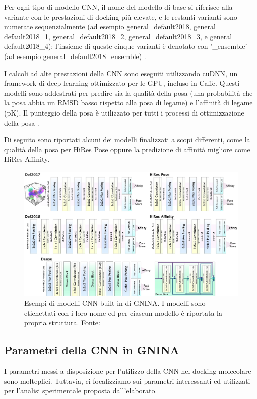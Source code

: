 Per ogni tipo di modello CNN, il nome del modello di base si riferisce alla variante con le prestazioni di docking più elevate, e le restanti varianti sono numerate sequenzialmente (ad esempio general\_default2018, general\_ default2018\_1, general\_default2018\_2, general\_default2018\_3, e general\_ default2018\_4); l'insieme di queste cinque varianti è denotato con '\_ensemble' (ad esempio general\_default2018\_ensemble) \cite{mcnutt_gnina_2021}. 

I calcoli ad alte prestazioni della CNN sono eseguiti utilizzando cuDNN, un framework di deep learning  ottimizzato per le GPU, incluso in Caffe. Questi modelli sono addestrati per predire sia la qualità della posa (una probabilità che la posa abbia un RMSD basso rispetto alla posa di legame) e l'affinità di legame (pK). 
Il punteggio della posa è utilizzato per tutti i processi di ottimizzazione della posa \cite{mcnutt_gnina_2021}.

Di seguito sono riportati alcuni dei modelli finalizzati a scopi differenti, come la qualità della posa per HiRes Pose oppure la predizione di affinità migliore come HiRes Affinity.
\begin{figure}[H]
    \centering
    \includegraphics[scale=0.12]{images/models.jpg}
    \caption[Esempi di modelli CNN built-in di GNINA.]{Esempi di modelli CNN built-in di GNINA. I modelli sono etichettati con i loro nome ed per ciascun modello è riportata la propria struttura. Fonte: \cite{mcnutt_gnina_2021}}
    \label{fig:models}
\end{figure}

\subsection{Parametri della CNN in GNINA} \label{cnn_params}
I parametri messi a disposizione per l'utilizzo della CNN nel docking molecolare sono molteplici. Tuttavia, ci focalizziamo sui parametri interessanti ed utilizzati per l'analisi sperimentale proposta dall'elaborato.

